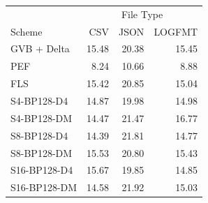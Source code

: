 \begin{tabular}{lrrr}
\toprule
 & \multicolumn{3}{c}{File Type} \\
Scheme & CSV & JSON & LOGFMT \\
\midrule
GVB + Delta & 15.48 & 20.38 & 15.45 \\
PEF & 8.24 & 10.66 & 8.88 \\
FLS & 15.42 & 20.85 & 15.04 \\
S4-BP128-D4 & 14.87 & 19.98 & 14.98 \\
S4-BP128-DM & 14.47 & 21.47 & 16.77 \\
S8-BP128-D4 & 14.39 & 21.81 & 14.77 \\
S8-BP128-DM & 15.53 & 20.80 & 15.43 \\
S16-BP128-D4 & 15.67 & 19.85 & 14.85 \\
S16-BP128-DM & 14.58 & 21.92 & 15.03 \\
\bottomrule
\end{tabular}
